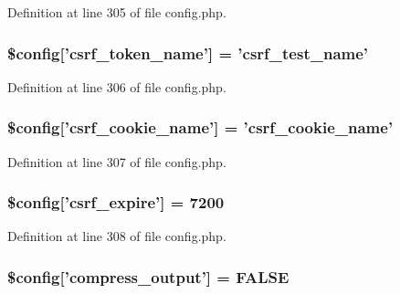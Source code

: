Definition at line 305 of file config.\-php.

\hypertarget{application_2config_2config_8php_af0e5ccff5383b00a56f4ad3ee0d289d2}{
\subsubsection[{\$config}]{\setlength{\rightskip}{0pt plus 5cm}\$config\mbox{[}'csrf\-\_\-token\-\_\-name'\mbox{]} = 'csrf\-\_\-test\-\_\-name'}}\label{application_2config_2config_8php_af0e5ccff5383b00a56f4ad3ee0d289d2}


Definition at line 306 of file config.\-php.

\hypertarget{application_2config_2config_8php_ad8f36090649afb3101c3c337c1d722a1}{
\subsubsection[{\$config}]{\setlength{\rightskip}{0pt plus 5cm}\$config\mbox{[}'csrf\-\_\-cookie\-\_\-name'\mbox{]} = 'csrf\-\_\-cookie\-\_\-name'}}\label{application_2config_2config_8php_ad8f36090649afb3101c3c337c1d722a1}


Definition at line 307 of file config.\-php.

\hypertarget{application_2config_2config_8php_af5c0ea7b77c40439da4f23b7cbb9c2e4}{
\subsubsection[{\$config}]{\setlength{\rightskip}{0pt plus 5cm}\$config\mbox{[}'csrf\-\_\-expire'\mbox{]} = 7200}}\label{application_2config_2config_8php_af5c0ea7b77c40439da4f23b7cbb9c2e4}


Definition at line 308 of file config.\-php.

\hypertarget{application_2config_2config_8php_a5f03a6c067b921917c2d978f4991bcd1}{
\subsubsection[{\$config}]{\setlength{\rightskip}{0pt plus 5cm}\$config\mbox{[}'compress\-\_\-output'\mbox{]} = F\-A\-L\-S\-E}}\label{application_2config_2config_8php_a5f03a6c067b921917c2d978f4991bcd1}


